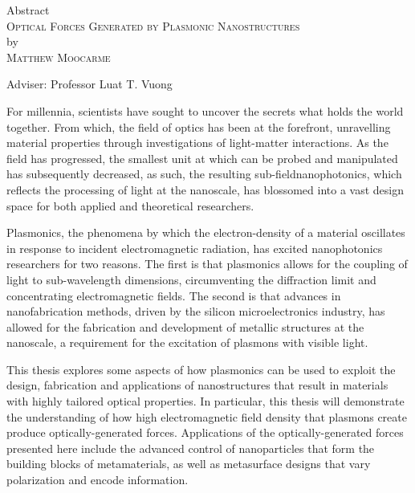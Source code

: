 \begin{center}
Abstract \\
\textsc{Optical Forces Generated by Plasmonic Nanostructures} \\
by \\
\textsc{Matthew Moocarme} \\[0.25in]
\end{center}

\vspace{0.25in}
\noindent Adviser: Professor Luat T. Vuong
\vspace{0.25in}
\noindent 

For millennia, scientists have sought to uncover the secrets what holds the world together. From which, the field of optics has been at the forefront, unravelling material properties through investigations of light-matter interactions. As the field has progressed, the smallest unit at which can be probed and manipulated has subsequently decreased, as such, the resulting sub-field\textemdash nanophotonics, which reflects the processing of light at the nanoscale, has blossomed into a vast design space for both applied and theoretical researchers.

Plasmonics, the phenomena by which the electron-density of a material oscillates in response to incident electromagnetic radiation, has excited nanophotonics researchers for two reasons. The first is that plasmonics allows for the coupling of light to sub-wavelength dimensions, circumventing the diffraction limit and concentrating electromagnetic fields. The second is that advances in nanofabrication methods, driven by the silicon microelectronics industry, has allowed for the fabrication and development of metallic structures at the nanoscale, a requirement for the excitation of plasmons with visible light.

This thesis explores some aspects of how plasmonics can be used to exploit the design, fabrication and applications of nanostructures that result in materials with highly tailored optical properties. In particular, this thesis will demonstrate the understanding of how high electromagnetic field density that plasmons create produce optically-generated forces. Applications of the optically-generated forces presented here include the advanced control of nanoparticles that form the building blocks of metamaterials, as well as metasurface designs that vary polarization and encode information. 


